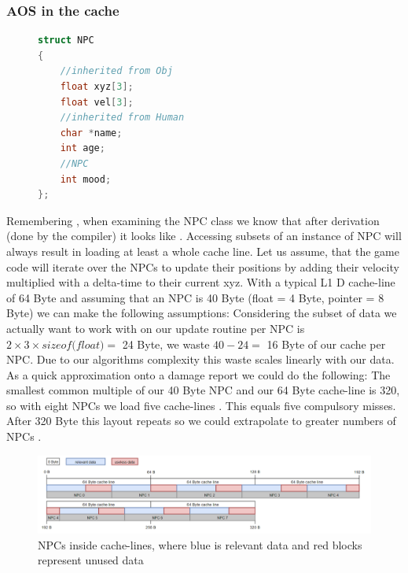 \subsubsection{AOS in the cache}
\begin{figure}
\vspace{-1cm}
\begin{lstlisting}[language=C++,numbers=none,name={NPC pod after derivation is done},label={post_deriv_npc}]
struct NPC 
{
	//inherited from Obj 
	float xyz[3];
	float vel[3];
	//inherited from Human
	char *name;
	int age;
	//NPC
	int mood;
};
\end{lstlisting}
\end{figure}
Remembering , when examining the NPC class we know that after derivation (done by the compiler) it looks like . Accessing subsets of an instance of NPC will always result in loading at least a whole cache line. Let us assume, that the game code will iterate over the NPCs to update their positions by adding their velocity multiplied with a delta-time to their current xyz. With a typical L1 D cache-line of 64 Byte and assuming that an NPC is 40 Byte (float = 4 Byte, pointer = 8 Byte) we can make the following assumptions: Considering the subset of data we actually want to work with on our update routine per NPC is $2\times 3\times \textit{sizeof(float)} = $ 24 Byte, we waste $40 - 24 =$ 16 Byte of our cache per NPC. Due to our algorithms complexity  this waste scales linearly with our data.\\
As a quick approximation onto a damage report we could do the following:
The smallest common multiple of our 40 Byte NPC and our 64 Byte cache-line is 320, so with eight NPCs we load five cache-lines . This equals five compulsory misses. After 320 Byte this layout repeats so we could extrapolate to greater numbers of NPCs . 
\begin{figure}[!htbp]
	\centering
	\includegraphics[width=1.0\linewidth, height=0.3\linewidth]{PICs/CacheUtilizationNPC}
	\caption{NPCs inside cache-lines, where blue is relevant data and red blocks represent unused data}\label{cache_utilization_npc}
\end{figure}
